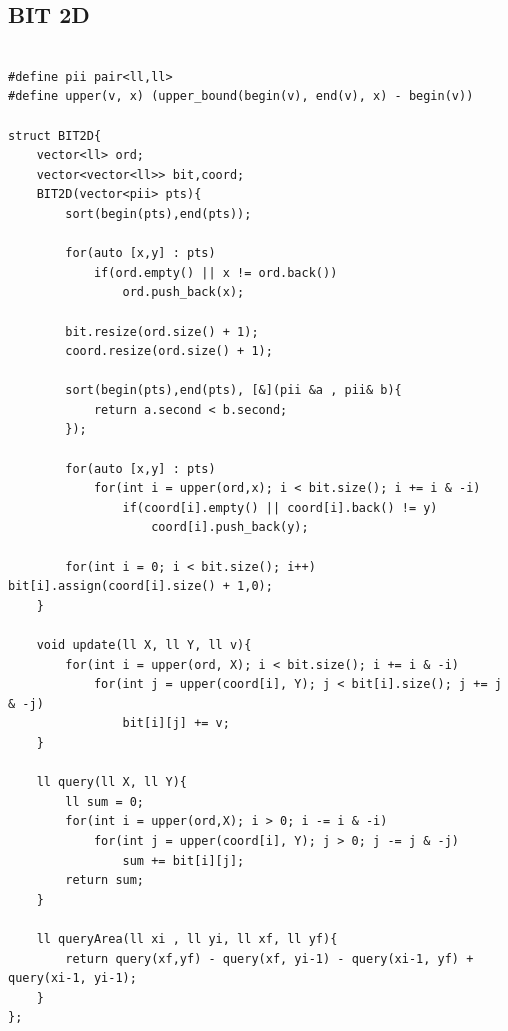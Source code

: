 \documentclass[11pt, a4paper, twoside]{article}
\begin{document}
\subsection{BIT 2D}
\begin{verbatim}

#define pii pair<ll,ll>
#define upper(v, x) (upper_bound(begin(v), end(v), x) - begin(v))

struct BIT2D{
    vector<ll> ord;
    vector<vector<ll>> bit,coord;
    BIT2D(vector<pii> pts){
        sort(begin(pts),end(pts));
     
        for(auto [x,y] : pts)
            if(ord.empty() || x != ord.back())
                ord.push_back(x);
            
        bit.resize(ord.size() + 1);
        coord.resize(ord.size() + 1);
            
        sort(begin(pts),end(pts), [&](pii &a , pii& b){
            return a.second < b.second;
        });
     
        for(auto [x,y] : pts)
            for(int i = upper(ord,x); i < bit.size(); i += i & -i)
                if(coord[i].empty() || coord[i].back() != y)
                    coord[i].push_back(y);
            
        for(int i = 0; i < bit.size(); i++) bit[i].assign(coord[i].size() + 1,0);
    }
     
    void update(ll X, ll Y, ll v){
        for(int i = upper(ord, X); i < bit.size(); i += i & -i)
            for(int j = upper(coord[i], Y); j < bit[i].size(); j += j & -j)
                bit[i][j] += v;
    }
     
    ll query(ll X, ll Y){
        ll sum = 0;
        for(int i = upper(ord,X); i > 0; i -= i & -i)
            for(int j = upper(coord[i], Y); j > 0; j -= j & -j)
                sum += bit[i][j];
        return sum;
    }
     
    ll queryArea(ll xi , ll yi, ll xf, ll yf){
        return query(xf,yf) - query(xf, yi-1) - query(xi-1, yf) + query(xi-1, yi-1);
    }
};
\end{verbatim}
\end{document}
